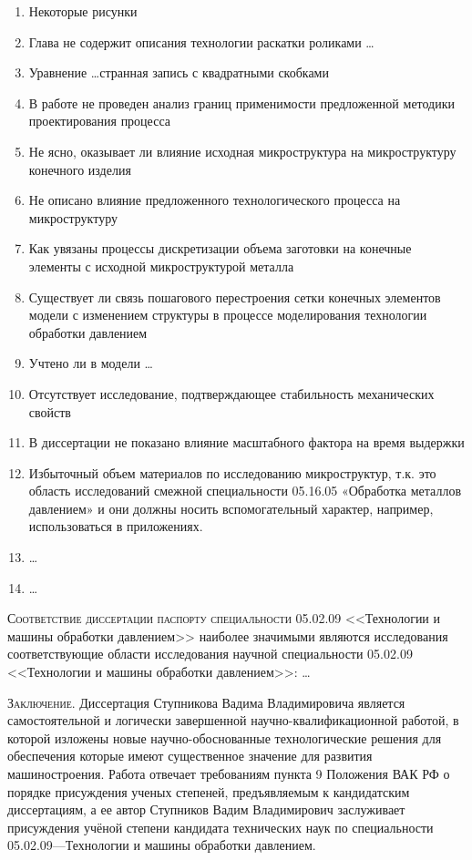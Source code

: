 \begin{enumerate}
    \item Некоторые рисунки
    \item Глава  не содержит описания технологии раскатки роликами \ldots
    \item Уравнение \ldots странная запись с квадратными скобками
    \item В работе не проведен анализ границ применимости предложенной методики проектирования процесса 
    \item Не ясно, оказывает ли влияние исходная микроструктура на микроструктуру конечного изделия
    \item Не описано влияние предложенного технологического процесса на микроструктуру
    \item Как увязаны процессы дискретизации объема заготовки на конечные элементы с исходной микроструктурой металла
    \item Существует ли связь пошагового перестроения сетки конечных элементов модели с изменением структуры в процессе моделирования технологии обработки давлением
    \item Учтено ли в модели \ldots
    \item Отсутствует исследование, подтверждающее стабильность механических свойств
    \item В диссертации не показано влияние масштабного фактора на время выдержки
    \item Избыточный объем материалов по исследованию микроструктур, т.к. это область исследований смежной специальности 05.16.05 «Обработка металлов давлением» и они должны носить вспомогательный характер, например, использоваться в приложениях.
    \item \ldots
    \item \ldots
    
\end{enumerate}

\textsc{Соответствие диссертации паспорту специальности} 05.02.09 <<Технологии и машины обработки давлением>> наиболее значимыми являются исследования соответствующие области исследования научной специальности 05.02.09 <<Технологии и машины обработки давлением>>:
\ldots

\textsc{Заключение.}
Диссертация Ступникова Вадима Владимировича является самостоятельной и логически завершенной научно-квалификационной работой, в которой изложены новые научно-обоснованные технологические решения для обеспечения {\celTEXT} которые имеют существенное значение для развития машиностроения. Работа отвечает требованиям пункта 9 Положения ВАК РФ о порядке присуждения ученых степеней, предъявляемым к кандидатским диссертациям, а ее автор Ступников Вадим Владимирович заслуживает присуждения учёной степени кандидата технических наук по специальности 05.02.09---Технологии и машины обработки давлением.


